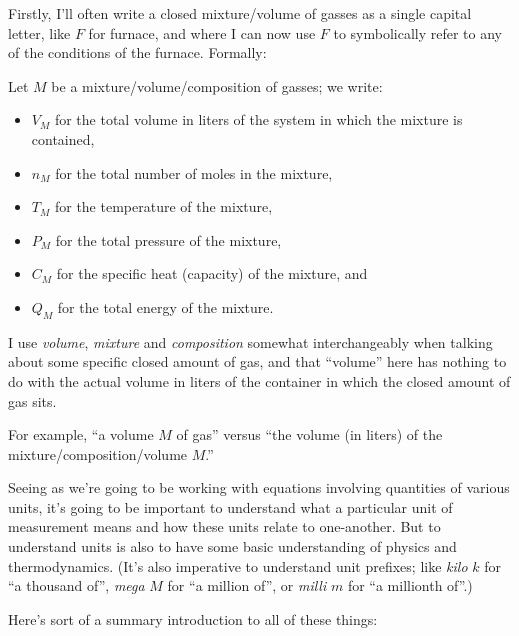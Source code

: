 \documentclass{article}
\begin{document}
Firstly, I'll often write a closed mixture/volume of gasses as a single capital letter, like $F$ for
furnace, and where I can now use $F$ to symbolically refer to any of the conditions of the furnace.
Formally:
\begin{definition}
    Let $M$ be a mixture/volume/composition of gasses; we write:
    \begin{itemize}
        \item $V_M$ for the total volume in liters of the system in which the mixture is contained,
        \item $n_M$ for the total number of moles in the mixture,
        \item $T_M$ for the temperature of the mixture,
        \item $P_M$ for the total pressure of the mixture,
        \item $C_M$ for the specific heat (capacity) of the mixture, and
        \item $Q_M$ for the total energy of the mixture.
    \end{itemize}
\end{definition}
\begin{note*}
    I use \emph{volume}, \emph{mixture} and \emph{composition} somewhat interchangeably when talking
    about some specific closed amount of gas, and that ``volume'' here has nothing to do with the
    actual volume in liters of the container in which the closed amount of gas sits.

    For example, ``a volume $M$ of gas'' versus ``the volume (in liters) of the
    mixture/composition/volume $M$.''
\end{note*}
\begin{note*}
    Seeing as we're going to be working with equations involving quantities of various units, it's
    going to be important to understand what a particular unit of measurement means and how these
    units relate to one-another. But to understand units is also to have some basic understanding
    of physics and thermodynamics.
    (It's also imperative to understand unit prefixes; like \emph{kilo} $k$ for ``a thousand of'',
    \emph{mega} $M$ for ``a million of'', or \emph{milli} $m$ for ``a millionth of''.)

    Here's sort of a summary introduction to all of these things:
\end{note*}
\end{document}
